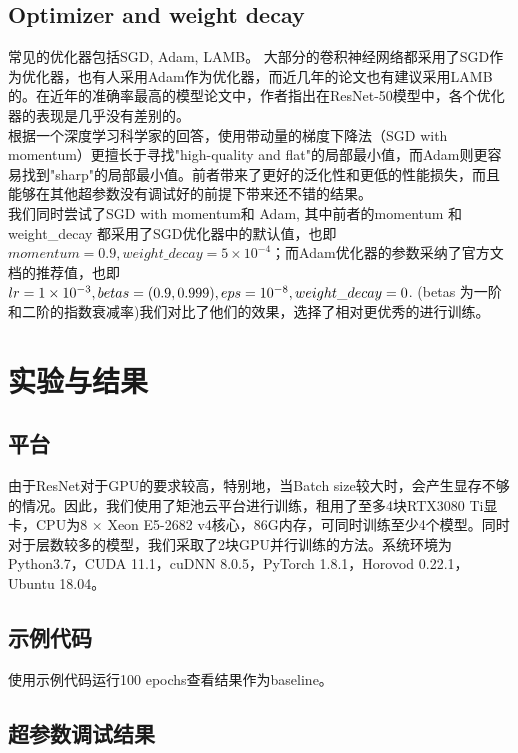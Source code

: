 \documentclass{article}
\theoremstyle{definition}
\begin{document}
\subsection{Optimizer and weight decay}
常见的优化器包括SGD, Adam, LAMB。 大部分的卷积神经网络都采用了SGD作为优化器，也有人采用Adam作为优化器，而近几年的论文也有建议采用LAMB的。在近年的准确率最高的模型论文中，作者指出在ResNet-50模型中，各个优化器的表现是几乎没有差别的。\cite{dosovitskiy2021image}\\
\indent
根据一个深度学习科学家的回答\cite{QuoraAnswer}，使用带动量的梯度下降法（SGD with momentum）更擅长于寻找"high-quality and flat"的局部最小值，而Adam则更容易找到"sharp"的局部最小值。前者带来了更好的泛化性和更低的性能损失，而且能够在其他超参数没有调试好的前提下带来还不错的结果。\\
\indent
我们同时尝试了SGD with momentum和 Adam, 其中前者的momentum 和weight\_decay 都采用了SGD优化器中的默认值，也即$momentum = 0.9, weight\_decay = 5 \times 10 ^ {-4}$；而Adam优化器的参数采纳了官方文档的推荐值，也即$lr = 1 \times 10^{-3}, \space betas=(0.9, 0.999), \space eps = 10 ^ {-8}, \space weight\_decay = 0$. (betas 为一阶和二阶的指数衰减率)我们对比了他们的效果，选择了相对更优秀的进行训练。

\section{实验与结果}
\subsection{平台}
由于ResNet对于GPU的要求较高，特别地，当Batch size较大时，会产生显存不够的情况。因此，我们使用了矩池云平台进行训练，租用了至多4块RTX3080 Ti显卡，CPU为8 $\times$ Xeon E5-2682 v4核心，86G内存，可同时训练至少4个模型。同时对于层数较多的模型，我们采取了2块GPU并行训练的方法。系统环境为Python3.7，CUDA 11.1，cuDNN 8.0.5，PyTorch 1.8.1，Horovod 0.22.1，Ubuntu 18.04。

\subsection{示例代码}
使用示例代码运行100 epochs查看结果作为baseline。

\subsection{超参数调试结果}
\end{document}
